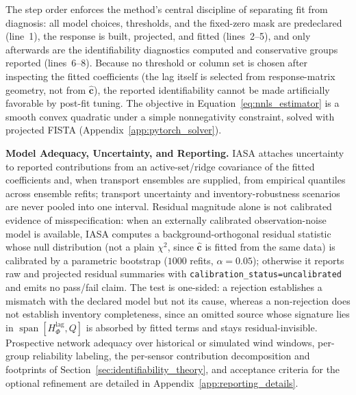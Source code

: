 The step order enforces the method's central discipline of separating fit from
diagnosis: all model choices, thresholds, and the fixed-zero mask are predeclared
(line~1), the response is built, projected, and fitted (lines~2--5), and only
afterwards are the identifiability diagnostics computed and conservative groups
reported (lines~6--8).  Because no threshold or column set is chosen after
inspecting the fitted coefficients (the lag itself is selected from response-matrix
geometry, not from \(\widehat{\mathbf c}\)), the reported identifiability cannot be
made artificially favorable by post-fit tuning.  The objective in
Equation~\ref{eq:nnls_estimator} is a smooth convex quadratic under a simple
nonnegativity constraint, solved with projected FISTA \citep{beck2009fast}
(Appendix~\ref{app:pytorch_solver}).

\noindent\textbf{Model Adequacy, Uncertainty, and Reporting.}
IASA attaches uncertainty to reported contributions from an active-set/ridge
covariance of the fitted coefficients and, when transport ensembles are supplied,
from empirical quantiles across ensemble refits; transport uncertainty and
inventory-robustness scenarios are never pooled into one interval.  Residual
magnitude alone is not calibrated evidence of misspecification: when an externally
calibrated observation-noise model is available, IASA computes a
background-orthogonal residual statistic whose null distribution (not a plain
\(\chi^2\), since \(\widehat{\mathbf c}\) is fitted from the same data) is
calibrated by a parametric bootstrap (\(1000\) refits, \(\alpha=0.05\)); otherwise
it reports raw and projected residual summaries with
\texttt{calibration\_status=uncalibrated} and emits no pass/fail claim.  The test
is one-sided: a rejection establishes a mismatch with the declared model but not
its cause, whereas a non-rejection does not establish inventory completeness, since
an omitted source whose signature lies in
\(\operatorname{span}[H_\Phi^{\mathrm{lag}},Q]\) is absorbed by fitted terms and
stays residual-invisible.  Prospective network adequacy over historical or
simulated wind windows, per-group reliability labeling, the per-sensor
contribution decomposition and footprints of
Section~\ref{sec:identifiability_theory}, and acceptance criteria for the
optional refinement are detailed in Appendix~\ref{app:reporting_details}.
